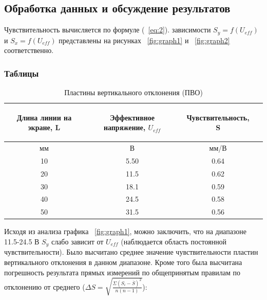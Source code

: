 \subsection{Обработка данных и обсуждение результатов}
Чувствительность вычисляется по формуле (~\ref{eq:2}). 
 зависимости $S_y=f(U_{eff})$ и $S_x=f(U_{eff})$ представлены на рисунках ~\ref{fig:graph1} и ~\ref{fig:graph2} соответственно.
\subsubsection{Таблицы}
\begin{center}
\begin{table}[h!]
\centering
\caption{Пластины вертикального отклонения (ПВО)}
\label{tabl:1}
\begin{tabular}{|c|c|c|c|}
\hline
\begin{minipage}{5cm}
\begin{center}
       Длина линии на экране, L
\end{center}
\end{minipage} &
\begin{minipage}{5cm}
\begin{center}
    Эффективное напряжение, $U_{eff}$
    \end{center}
\end{minipage} &
\begin{minipage}{5cm}
\begin{center}
    Чувствительность, S
\end{center}
\end{minipage}\\
\hline
мм&В&мм/В\\
\hline
10  &  5.50  &  0.64 \\
20  &  11.5  &  0.62\\
30  &  18.1  &  0.59 \\
40  &  24.5  &  0.58 \\
50  &  31.5  &  0.56 \\

\hline
\end{tabular}
\end{table}
\end{center}
Исходя из анализа графика ~\ref{fig:graph1}, можно заключить, что на диапазоне 11.5-24.5 В $S_y$ слабо зависит от $U_{eff}$ (наблюдается область постоянной чувствительности). Было высчитано среднее значение чувствительности пластин вертикального отклонения в данном диапазоне. Кроме того была высчитана погрешность результата прямых измерений по общепринятым правилам по отклонению от среднего ($\Delta S=\sqrt{\frac{\Sigma{(S_i-\overline{S})^2}}{n(n-1)}}$):
